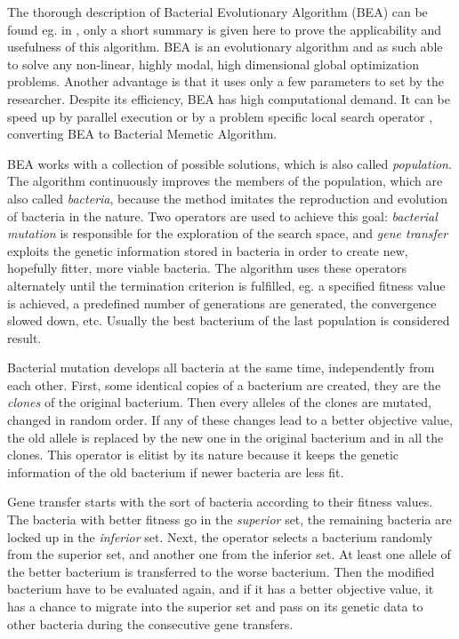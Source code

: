 \documentclass[graybox]{svmult}
\begin{document}
The thorough description of Bacterial Evolutionary Algorithm (BEA) 
can be found eg. in \cite
{nawa1997study,nawa1998study,nawa1998bacterial,nawa1999fuzzy}, only 
a short summary is given here to prove the applicability and 
usefulness of this algorithm. BEA is an evolutionary algorithm and 
as such able to solve any non-linear, highly modal, high dimensional 
global optimization problems. Another advantage is that it uses only 
a few parameters to set by the researcher. Despite its efficiency, 
BEA has high computational demand. It can be speed up by parallel 
execution \cite{hatwagner2011parallel} or by a problem specific 
local search operator \cite{koczy2018enhanced}, converting BEA to 
Bacterial Memetic Algorithm.

BEA works with a collection of possible solutions, which is also called 
\emph{population}. The algorithm continuously improves the members of 
the population, which are also called \emph{bacteria}, because the 
method imitates the reproduction and evolution of bacteria in the 
nature. Two operators are used to achieve this goal: \emph{bacterial 
mutation} is responsible for the exploration of the search space, and 
\emph{gene transfer} exploits the genetic information stored in 
bacteria in order to create new, hopefully fitter, more viable 
bacteria. The algorithm uses these operators alternately until the 
termination criterion is fulfilled, eg. a specified fitness value is 
achieved, a predefined number of generations are generated, the 
convergence slowed down, etc. Usually the best bacterium of the 
last population is considered result.

Bacterial mutation develops all bacteria at the same time, 
independently from each other. First, some identical copies of a 
bacterium are created, they are the \emph{clones} of the original 
bacterium. Then every alleles of the clones are mutated, changed in 
random order. If any of these changes lead to a better objective 
value, the old allele is replaced by the new one in the original 
bacterium and in all the clones. This operator is elitist by its 
nature because it keeps the genetic information of the old bacterium 
if newer bacteria are less fit.

Gene transfer starts with the sort of bacteria according to their 
fitness values. The bacteria with better fitness go in the 
\emph{superior} set, the remaining bacteria are locked up in the 
\emph{inferior} set. Next, the operator selects a bacterium randomly 
from the superior set, and another one from the inferior set. At least 
one allele of the better bacterium is transferred to the worse 
bacterium. Then the modified bacterium have to be evaluated again, and 
if it has a better objective value, it has a chance to migrate into 
the superior set and pass on its genetic data to other bacteria during 
the consecutive gene transfers.
\end{document}
